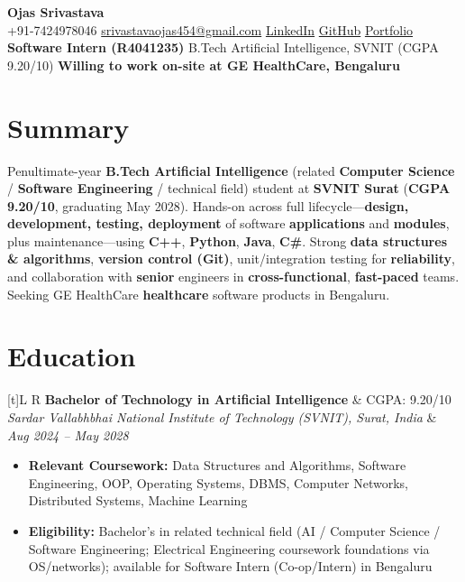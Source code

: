 \documentclass[a4paper,10pt]{article}
\newcommand{\resumeSubheading}[4]{%
  \vspace{0.5mm}
  \noindent
  \begin{tabularx}{\textwidth}[t]{L R}
    \textbf{#1} & #4 \\
    \textit{#3} & \textit{#2} \\
  \end{tabularx}
  \vspace{-0.5mm}%
}
\begin{document}
\selectfont

\begin{center}
  {\LARGE \textbf{Ojas Srivastava}} \\[1mm]
  \small
  +91-7424978046 \textbar{}
  \href{mailto:srivastavaojas454@gmail.com}{srivastavaojas454@gmail.com} \textbar{}
  \href{https://linkedin.com/in/ojas-srivastava05}{LinkedIn} \textbar{}
  \href{https://github.com/Ojas-Srivastava05}{GitHub} \textbar{}
  \href{https://ojas-srivastava.vercel.app}{Portfolio} \\[0.5mm]
  \textbf{Software Intern (R4041235)} \textbar{}
  B.Tech Artificial Intelligence, SVNIT (CGPA 9.20/10) \textbar{}
  \textbf{Willing to work on-site at GE HealthCare, Bengaluru}
\end{center}

\vspace{-1mm}

\section{Summary}
\small
Penultimate-year \textbf{B.Tech Artificial Intelligence} (related \textbf{Computer Science} / \textbf{Software Engineering} / technical field) student at \textbf{SVNIT Surat} (\textbf{CGPA 9.20/10}, graduating May 2028). Hands-on across full lifecycle---\textbf{design, development, testing, deployment} of software \textbf{applications} and \textbf{modules}, plus maintenance---using \textbf{C++}, \textbf{Python}, \textbf{Java}, \textbf{C\#}. Strong \textbf{data structures \& algorithms}, \textbf{version control (Git)}, unit/integration testing for \textbf{reliability}, and collaboration with \textbf{senior} engineers in \textbf{cross-functional}, \textbf{fast-paced} teams. Seeking GE HealthCare \textbf{healthcare} software products in Bengaluru.

\section{Education}
\small
\resumeSubheading
  {Bachelor of Technology in Artificial Intelligence}{Aug 2024 -- May 2028}
  {Sardar Vallabhbhai National Institute of Technology (SVNIT), Surat, India}{CGPA: 9.20/10}
\begin{itemize}
  \item \textbf{Relevant Coursework:} Data Structures and Algorithms, Software Engineering, OOP, Operating Systems, DBMS, Computer Networks, Distributed Systems, Machine Learning
  \item \textbf{Eligibility:} Bachelor's in related technical field (AI / Computer Science / Software Engineering; Electrical Engineering coursework foundations via OS/networks); available for Software Intern (Co-op/Intern) in Bengaluru
\end{itemize}
\end{document}
